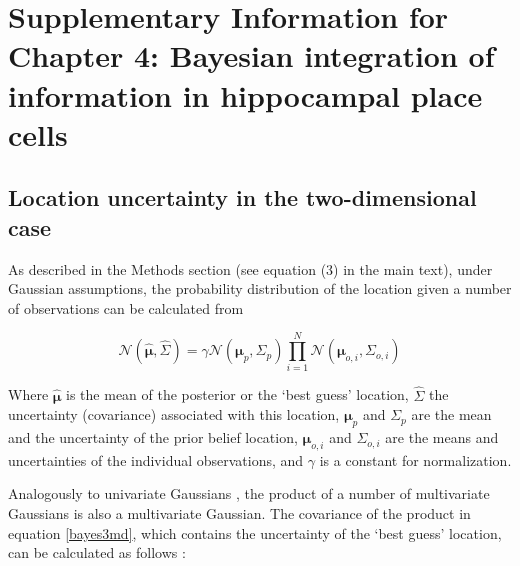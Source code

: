 %
%


\chapter{Supplementary Information for Chapter 4: Bayesian integration of information in hippocampal place cells}
\label{apx:bayespc}

\section{Location uncertainty in the two-dimensional case}

As described in the Methods section (see equation (3) in the main text), under Gaussian assumptions, the probability distribution of the location given a number of observations can be calculated from 

\begin{equation}\label{bayes3md}
\mathcal{N}( \hat{ \boldsymbol \mu }, \hat{ \Sigma } ) = \gamma \mathcal{N}( \boldsymbol \mu_p, \Sigma_p ) \prod_{i=1}^N { \mathcal{N}( \boldsymbol \mu_{o,i}, \Sigma_{o,i} ) }
\end{equation}

Where $ \hat{\boldsymbol \mu} $ is the mean of the posterior or the `best guess' location, $\hat{ \Sigma }$ the uncertainty (covariance) associated with this location, $\boldsymbol \mu_p$ and $\Sigma_p$ are the mean and the uncertainty of the prior belief location, $ \boldsymbol \mu_{o,i} $ and $ \Sigma_{o,i} $ are the means and uncertainties of the individual observations, and $ \gamma $ is a constant for normalization. 

Analogously to univariate Gaussians \citep{bromiley2003products}, the product of a number of multivariate Gaussians is also a multivariate Gaussian. The covariance of the product in equation \eqref{bayes3md}, which contains the uncertainty of the `best guess' location, can be calculated as follows \citep{Wu04someproperties}:

